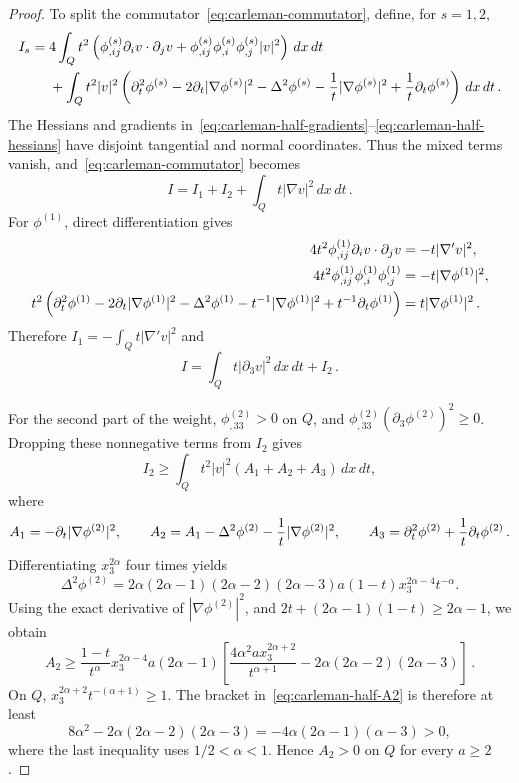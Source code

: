 \documentclass[11pt,letterpaper]{article}
\numberwithin{equation}{section}
\theoremstyle{plain}
\theoremstyle{definition}
\theoremstyle{remark}
\begin{document}
\begin{proof}
To split the commutator~\eqref{eq:carleman-commutator}, define, for $s=1,2$,
\begin{align*}
 I_s={}&4\int_Q t^2\left(\phi^{(s)}_{,ij}\partial_i v\cdot\partial_jv
       +\phi^{(s)}_{,ij}\phi^{(s)}_{,i}\phi^{(s)}_{,j}|v|^2\right)\,dx\,dt\\
 &+\int_Q t^2|v|^2\left(\partial_t^2\phi^{(s)}-2\partial_t|\nabla\phi^{(s)}|^2-\Delta^2\phi^{(s)}
       -\frac1t|\nabla\phi^{(s)}|^2+\frac1t\partial_t\phi^{(s)}\right)\,dx\,dt\,.
\end{align*}
The Hessians and gradients in~\eqref{eq:carleman-half-gradients}--\eqref{eq:carleman-half-hessians} have disjoint tangential and normal coordinates. Thus the mixed terms vanish, and~\eqref{eq:carleman-commutator} becomes
\begin{equation}\label{eq:carleman-half-I-split}
 I=I_1+I_2+\int_Q t|\nabla v|^2\,dx\,dt\,.
\end{equation}
For $\phi^{(1)}$, direct differentiation gives
\begin{align*}
 4t^2\phi^{(1)}_{,ij}\partial_i v\cdot\partial_jv
 &=-t|\nabla'v|^2,\\
 4t^2\phi^{(1)}_{,ij}\phi^{(1)}_{,i}\phi^{(1)}_{,j}
 &=-t|\nabla\phi^{(1)}|^2,\\
 t^2\left(\partial_t^2\phi^{(1)}-2\partial_t|\nabla\phi^{(1)}|^2-\Delta^2\phi^{(1)}
       -t^{-1}|\nabla\phi^{(1)}|^2+t^{-1}\partial_t\phi^{(1)}\right)
 &=t|\nabla\phi^{(1)}|^2\,.
\end{align*}
Therefore $I_1=-\int_Qt|\nabla'v|^2$ and
\begin{equation}\label{eq:carleman-half-I1}
 I=\int_Q t|\partial_3v|^2\,dx\,dt+I_2\,.
\end{equation}

For the second part of the weight, $\phi^{(2)}_{,33}>0$ on $Q$, and
$\phi^{(2)}_{,33}(\partial_3\phi^{(2)})^2\ge0$. Dropping these nonnegative terms from $I_2$ gives
\begin{equation}\label{eq:carleman-half-A}
 I_2\ge\int_Q t^2|v|^2(A_1+A_2+A_3)\,dx\,dt,
\end{equation}
where
\[
 A_1=-\partial_t|\nabla\phi^{(2)}|^2,\qquad
 A_2=A_1-\Delta^2\phi^{(2)}-\frac1t|\nabla\phi^{(2)}|^2,\qquad
 A_3=\partial_t^2\phi^{(2)}+\frac1t\partial_t\phi^{(2)}\,.
\]
Differentiating $x_3^{2\alpha}$ four times yields
\[
 \Delta^2\phi^{(2)}=2\alpha(2\alpha-1)(2\alpha-2)(2\alpha-3)
              a(1-t)x_3^{2\alpha-4}t^{-\alpha}.
\]
Using the exact derivative of $|\nabla\phi^{(2)}|^2$, and
$2t+(2\alpha-1)(1-t)\ge2\alpha-1$, we obtain
\begin{equation}\label{eq:carleman-half-A2}
 A_2\ge\frac{1-t}{t^\alpha}x_3^{2\alpha-4}a(2\alpha-1)
 \left[\frac{4\alpha^2a x_3^{2\alpha+2}}{t^{\alpha+1}}
              -2\alpha(2\alpha-2)(2\alpha-3)\right]\,.
\end{equation}
On $Q$, $x_3^{2\alpha+2}t^{-(\alpha+1)}\ge1$. The bracket in~\eqref{eq:carleman-half-A2} is therefore at least
\[
 8\alpha^2-2\alpha(2\alpha-2)(2\alpha-3)
 =-4\alpha(2\alpha-1)(\alpha-3)>0,
\]
where the last inequality uses $1/2<\alpha<1$. Hence $A_2>0$ on $Q$ for every $a\ge2$.


\end{proof}
\end{document}
